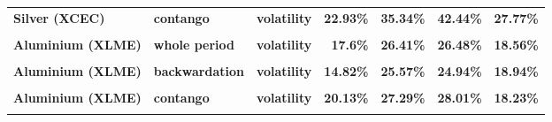 \documentclass[
  authoryear,
  preprint,
  3p]{elsarticle}
\begin{document}
\begin{longtable}[t]{>{}l>{}l>{}l>{}r>{}r>{}r>{}r}
\textbf{Silver (XCEC)} & \textbf{contango} & \textbf{volatility} & \textcolor[HTML]{4285f4}{\textbf{22.93\%}} & \textcolor[HTML]{4285f4}{\textbf{35.34\%}} & \textcolor[HTML]{4285f4}{\textbf{42.44\%}} & \textcolor[HTML]{4285f4}{\textbf{27.77\%}}\\
\textbf{\cellcolor{gray!10}{Aluminium (XLME)}} & \textbf{\cellcolor{gray!10}{whole period}} & \textbf{\cellcolor{gray!10}{mean}} & \textcolor[HTML]{4285f4}{\textbf{\cellcolor{gray!10}{1.13\%}}} & \textcolor[HTML]{4285f4}{\textbf{\cellcolor{gray!10}{13.78\%}}} & \textcolor[HTML]{4285f4}{\textbf{\cellcolor{gray!10}{-3.58\%}}} & \textcolor[HTML]{4285f4}{\textbf{\cellcolor{gray!10}{3.15\%}}}\\
\addlinespace
\textbf{Aluminium (XLME)} & \textbf{whole period} & \textbf{volatility} & \textcolor[HTML]{4285f4}{\textbf{17.6\%}} & \textcolor[HTML]{4285f4}{\textbf{26.41\%}} & \textcolor[HTML]{4285f4}{\textbf{26.48\%}} & \textcolor[HTML]{4285f4}{\textbf{18.56\%}}\\
\textbf{\cellcolor{gray!10}{Aluminium (XLME)}} & \textbf{\cellcolor{gray!10}{backwardation}} & \textbf{\cellcolor{gray!10}{mean}} & \textcolor[HTML]{4285f4}{\textbf{\cellcolor{gray!10}{2.56\%}}} & \textcolor[HTML]{4285f4}{\textbf{\cellcolor{gray!10}{14.78\%}}} & \textcolor[HTML]{4285f4}{\textbf{\cellcolor{gray!10}{16.25\%}}} & \textcolor[HTML]{4285f4}{\textbf{\cellcolor{gray!10}{**23.68\%}}}\\
\textbf{Aluminium (XLME)} & \textbf{backwardation} & \textbf{volatility} & \textcolor[HTML]{4285f4}{\textbf{14.82\%}} & \textcolor[HTML]{4285f4}{\textbf{25.57\%}} & \textcolor[HTML]{4285f4}{\textbf{24.94\%}} & \textcolor[HTML]{4285f4}{\textbf{18.94\%}}\\
\textbf{\cellcolor{gray!10}{Aluminium (XLME)}} & \textbf{\cellcolor{gray!10}{contango}} & \textbf{\cellcolor{gray!10}{mean}} & \textcolor[HTML]{4285f4}{\textbf{\cellcolor{gray!10}{-0.38\%}}} & \textcolor[HTML]{4285f4}{\textbf{\cellcolor{gray!10}{12.86\%}}} & \textcolor[HTML]{4285f4}{\textbf{\cellcolor{gray!10}{-23.04\%}}} & \textcolor[HTML]{4285f4}{\textbf{\cellcolor{gray!10}{-16.74\%}}}\\
\textbf{Aluminium (XLME)} & \textbf{contango} & \textbf{volatility} & \textcolor[HTML]{4285f4}{\textbf{20.13\%}} & \textcolor[HTML]{4285f4}{\textbf{27.29\%}} & \textcolor[HTML]{4285f4}{\textbf{28.01\%}} & \textcolor[HTML]{4285f4}{\textbf{18.23\%}}\\
\addlinespace
\textbf{\cellcolor{gray!10}{Copper (XLME)}} & \textbf{\cellcolor{gray!10}{whole period}} & \textbf{\cellcolor{gray!10}{mean}} & \textcolor[HTML]{4285f4}{\textbf{\cellcolor{gray!10}{0.45\%}}} & \textcolor[HTML]{4285f4}{\textbf{\cellcolor{gray!10}{**28.59\%}}} & \textcolor[HTML]{4285f4}{\textbf{\cellcolor{gray!10}{5.74\%}}} & \textcolor[HTML]{4285f4}{\textbf{\cellcolor{gray!10}{0.03\%}}}\\

\end{longtable}
\end{document}
